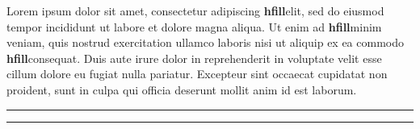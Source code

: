 \def\hfdemo{{\bf hfill}\hfill}

Lorem ipsum dolor sit amet, consectetur adipiscing \hfdemo elit, sed do eiusmod tempor incididunt ut labore et dolore magna aliqua. Ut enim ad \hfdemo minim veniam, quis nostrud exercitation ullamco laboris nisi ut aliquip ex ea commodo \hfdemo consequat. Duis aute irure dolor in reprehenderit in voluptate velit esse cillum dolore eu fugiat nulla pariatur. Excepteur sint occaecat cupidatat non proident, sunt in culpa qui officia deserunt mollit anim id est laborum.

\hrule
\hrule
\par






%

%




